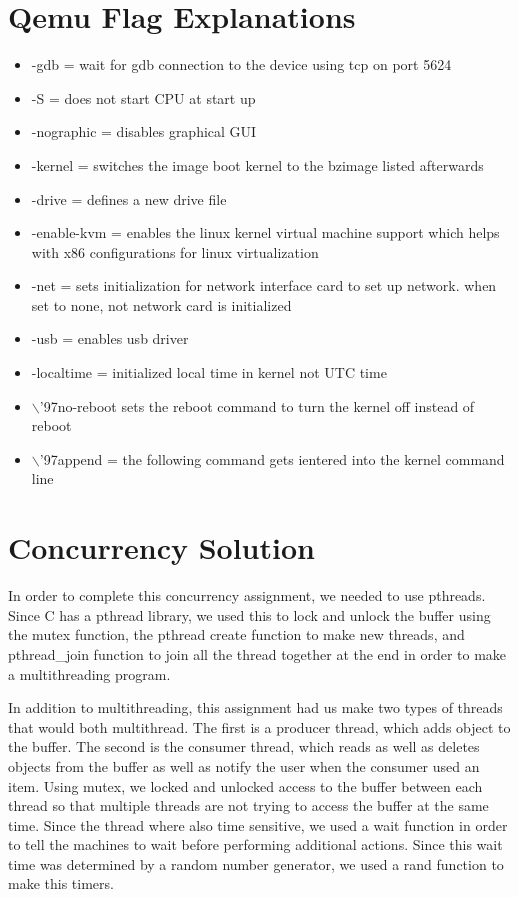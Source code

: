 \documentclass[letterpaper,10pt]{article}
\begin{document}
\section{Qemu Flag Explanations}
\begin{itemize}
    \item -gdb = wait for gdb connection to the device using tcp on port 5624
    \item -S = does not start CPU at start up
    \item -nographic = disables graphical GUI
    \item -kernel = switches the image boot kernel to the bzimage listed afterwards
    \item -drive = defines a new drive file
    \item -enable-kvm = enables the linux kernel virtual machine support which helps with x86 configurations for linux virtualization
    \item -net = sets initialization for network interface card to set up network. when set to none, not network card is initialized
    \item -usb = enables usb driver
    \item -localtime = initialized local time in kernel not UTC time
    \item $\backslash$'97no-reboot sets the reboot command to turn the kernel off instead of reboot
    \item $\backslash$'97append = the following command gets ientered into the kernel command line
\end{itemize}

\section{Concurrency Solution}
        In order to complete this concurrency assignment, we needed to use pthreads. Since C has a pthread library, we used this to lock and unlock the buffer using the mutex function, the pthread create function to make new threads, and pthread\_join function to join all the thread together at the end in order to make a multithreading program. 
        
        In addition to multithreading, this assignment had us make two types of threads that would both multithread. The first is a producer thread, which adds object to the buffer. The second is the consumer thread, which reads as well as deletes objects from the buffer as well as notify the user when the consumer used an item. Using mutex, we locked and unlocked access to the buffer between each thread so that multiple threads are not trying to access the buffer at the same time. Since the thread where also time sensitive, we used a wait function in order to tell the machines to wait before performing additional actions. Since this wait time was determined by a random number generator, we used a rand function to make this timers. 
        
\end{document}
